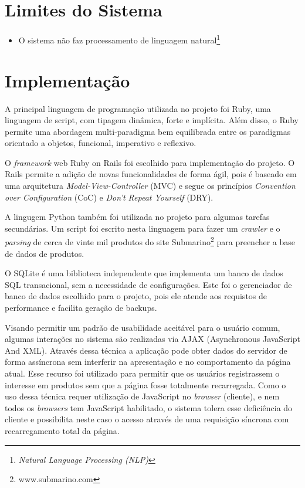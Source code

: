 \section{Limites do Sistema}

\begin{itemize}
  
    \item O sistema não faz processamento de linguagem natural\footnote{\textit{Natural Language Processing (NLP)}}

\end{itemize}

\section{Implementação} %
\label{sec:implementacao}

A principal linguagem de programação utilizada no projeto foi Ruby, uma linguagem de script, com tipagem dinâmica, forte e implícita. Além disso, o Ruby permite uma abordagem multi-paradigma bem equilibrada entre os paradigmas orientado a objetos, funcional, imperativo e reflexivo. 

O \emph{framework} web Ruby on Rails foi escolhido para implementação do projeto. O Rails permite a adição de novas funcionalidades de forma ágil, pois é baseado em uma arquitetura \emph{Model-View-Controller}\cite{burbeck1992applications} (MVC) e segue os princípios \emph{Convention over Configuration}\cite{ruby2009agile} (CoC) e \emph{Don't Repeat Yourself}\cite{hunt-don} (DRY).

A lingugem Python também foi utilizada no projeto para algumas tarefas secundárias. Um script foi escrito nesta linguagem para fazer um \emph{crawler} e o \emph{parsing} de cerca de vinte mil produtos do site Submarino\footnote{www.submarino.com} para preencher a base de dados de produtos.

O SQLite é uma biblioteca independente que implementa um banco de dados SQL transacional, sem a necessidade de configurações. Este foi o gerenciador de banco de dados escolhido para o projeto, pois ele atende aos requistos de performance e facilita geração de backups.

Visando permitir um padrão de usabilidade aceitável para o usuário comum, algumas interações no sistema são realizadas via AJAX (Asynchronous JavaScript And XML). Através dessa técnica a aplicação pode obter dados do servidor de forma assíncrona sem interferir na apresentação e no comportamento da página atual. Esse recurso foi utilizado para permitir que os usuários registrassem o interesse em produtos sem que a página fosse totalmente recarregada. Como o uso dessa técnica requer utilização de JavaScript no \emph{browser} (cliente), e nem todos os \emph{browsers} tem JavaScript habilitado, o sistema tolera esse deficiência do cliente e possibilita neste caso o acesso através de uma requisição síncrona com recarregamento total da página.

